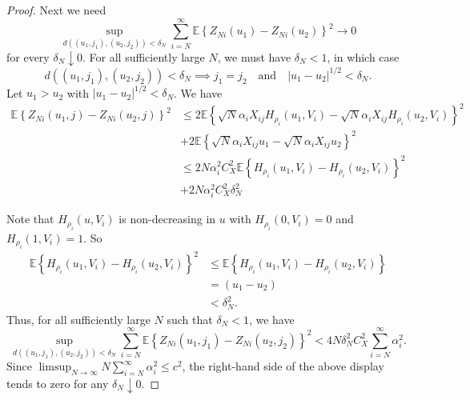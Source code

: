 \documentclass[11pt,a4paper]{article}
\newcommand{\E}{\mathbb{E}}
\begin{document}
\begin{appendices}
\begin{proof}
Next we need 
\begin{equation*}
    \sup_{d((u_{1},j_{1}),(u_{2},j_{2})) < \delta_{N}} \sum_{i=N}^{\infty} \E\left\{Z_{Ni}(u_{1})-Z_{Ni}(u_{2})\right\}^{2} \rightarrow 0
\end{equation*}
for every $\delta_{N} \downarrow 0$. For all sufficiently large $N$, we must have $\delta_{N} < 1$, in which case
\begin{equation*}
    d((u_{1},j_{1}),(u_{2},j_{2})) < \delta_{N} \implies j_{1} = j_{2} \quad \text{and} \quad |u_{1} - u_{2}|^{1/2} < \delta_{N}.
\end{equation*}
Let $u_{1} > u_{2}$ with $|u_{1} - u_{2}|^{1/2}  < \delta_{N}$. We have
\begin{align*}
     \E\left\{Z_{Ni}(u_{1}, j)-Z_{Ni}(u_{2},j)\right\}^{2}&\leq  2\E\left\{\sqrt{N}\alpha_{i}X_{ij}H_{\rho_{i}}(u_{1},V_{i})-\sqrt{N}\alpha_{i}X_{ij}H_{\rho_{i}}(u_{2},V_{i})\right\}^{2} \\
     &+ 2\E\left\{\sqrt{N}\alpha_{i}X_{ij}u_{1}-\sqrt{N}\alpha_{i}X_{ij}u_{2}\right\}^{2}\\
     &\leq  2N\alpha_{i}^{2}C_{X}^{2}\E\left\{H_{\rho_{i}}(u_{1},V_{i})-H_{\rho_{i}}(u_{2},V_{i})\right\}^{2} \\
     &+ 2N\alpha_{i}^{2}C_{X}^{2}\delta_{N}^{2}
\end{align*}

Note that $H_{\rho_{i}}(u,V_{i})$ is non-decreasing in $u$ with $H_{\rho_{i}}(0,V_{i}) = 0$ and $H_{\rho_{i}}(1,V_{i}) = 1$. So
\begin{align*}
    \E\left\{H_{\rho_{i}}(u_{1},V_{i})-H_{\rho_{i}}(u_{2},V_{i})\right\}^{2} &\leq \E\left\{H_{\rho_{i}}(u_{1},V_{i})-H_{\rho_{i}}(u_{2},V_{i})\right\} \\
    &= (u_{1}-u_{2})\\
    &< \delta_{N}^{2}.
\end{align*}
Thus, for all sufficiently large $N$ such that $\delta_{N} < 1$, we have
\begin{equation*}
    \sup_{d((u_{1},j_{1}),(u_{2},j_{2})) <\delta_{N}} \sum_{i=N}^{\infty}\E\left\{Z_{Ni}(u_{1}, j_{1})-Z_{Ni}(u_{2}, j_{2})\right\}^{2} < 4N\delta_{N}^{2} C_{X}^{2}\sum_{i=N}^{\infty} \alpha_{i}^{2}.
\end{equation*}
Since $\limsup_{N \rightarrow \infty} N \sum_{i=N}^{\infty} \alpha_{i}^{2} \leq c^{2}$, the right-hand side of the above display tends to zero for any $\delta_{N} \downarrow 0$.


\end{proof}
\end{appendices}
\end{document}
